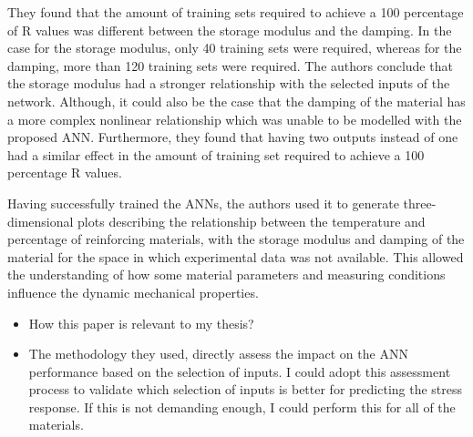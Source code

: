 \begin{enumerate}
    They found that the amount of training sets required to achieve a 100 percentage of R values was different between the storage modulus and the damping. In the case for the storage modulus, only 40 training sets were required, whereas for the damping, more than 120 training sets were required. The authors conclude that the storage modulus had a stronger relationship with the selected inputs of the network. Although, it could also be the case that the damping of the material has a more complex nonlinear relationship which was unable to be modelled with the proposed ANN. Furthermore, they found that having two outputs instead of one had a similar effect in the amount of training set required to achieve a 100 percentage R values.
    
    Having successfully trained the ANNs, the authors used it to generate three-dimensional plots describing the relationship between the temperature and percentage of reinforcing materials, with the storage modulus and damping of the material for the space in which experimental data was not available. This allowed the understanding of how some material parameters and measuring conditions influence the dynamic mechanical properties.
    \begin{itemize}
        \item How this paper is relevant to my thesis?
        \item The methodology they used, directly assess the impact on the ANN performance based on the selection of inputs. I  could adopt this assessment process to validate which selection of inputs is better for predicting the stress response. If this is not demanding enough, I could perform this for all of the materials.
    \end{itemize}
    

\end{enumerate}

